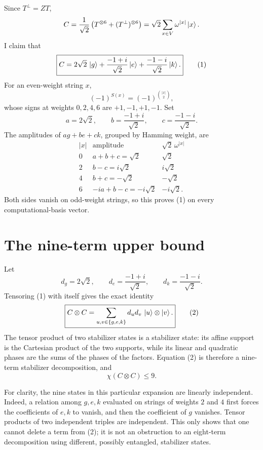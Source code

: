 \documentclass[11pt]{article}
\theoremstyle{definition}
\begin{document}
Since $T^\perp=ZT$,
\[
C=\frac1{\sqrt2}\left(T^{\otimes6}+(T^\perp)^{\otimes6}\right)
=\sqrt2\sum_{x\in V}\omega^{|x|}\ket{x}.
\]
I claim that
\begin{equation}
\boxed{
C=2\sqrt2\,\ket{g}
+\frac{-1+i}{\sqrt2}\ket{e}
+\frac{-1-i}{\sqrt2}\ket{k}.
}
\tag{1}
\end{equation}
For an even-weight string $x$,
\[
(-1)^{S(x)}=(-1)^{\binom{|x|}{2}},
\]
whose signs at weights $0,2,4,6$ are $+1,-1,+1,-1$. Set
\[
a=2\sqrt2,\qquad b=\frac{-1+i}{\sqrt2},\qquad
c=\frac{-1-i}{\sqrt2}.
\]
The amplitudes of $ag+be+ck$, grouped by Hamming weight, are
\[
\begin{array}{c|c|c}
|x|&\text{amplitude}&\sqrt2\,\omega^{|x|}\\ \hline
0&a+b+c=\sqrt2&\sqrt2\\
2&b-c=i\sqrt2&i\sqrt2\\
4&b+c=-\sqrt2&-\sqrt2\\
6&-ia+b-c=-i\sqrt2&-i\sqrt2.
\end{array}
\]
Both sides vanish on odd-weight strings, so this proves (1) on every computational-basis vector.

\section{The nine-term upper bound}

Let
\[
d_g=2\sqrt2,\qquad d_e=\frac{-1+i}{\sqrt2},\qquad
d_k=\frac{-1-i}{\sqrt2}.
\]
Tensoring (1) with itself gives the exact identity
\begin{equation}
\boxed{
C\otimes C
=\sum_{u,v\in\{g,e,k\}}d_ud_v\,\ket{u}\otimes\ket{v}.
}
\tag{2}
\end{equation}
The tensor product of two stabilizer states is a stabilizer state: its affine support is the Cartesian product of the two supports, while its linear and quadratic phases are the sums of the phases of the factors. Equation (2) is therefore a nine-term stabilizer decomposition, and
\[
\chi(C\otimes C)\leq9.
\]

For clarity, the nine states in this particular expansion are linearly independent. Indeed, a relation among $g,e,k$ evaluated on strings of weights $2$ and $4$ first forces the coefficients of $e,k$ to vanish, and then the coefficient of $g$ vanishes. Tensor products of two independent triples are independent. This only shows that one cannot delete a term from (2); it is not an obstruction to an eight-term decomposition using different, possibly entangled, stabilizer states.
\end{document}
